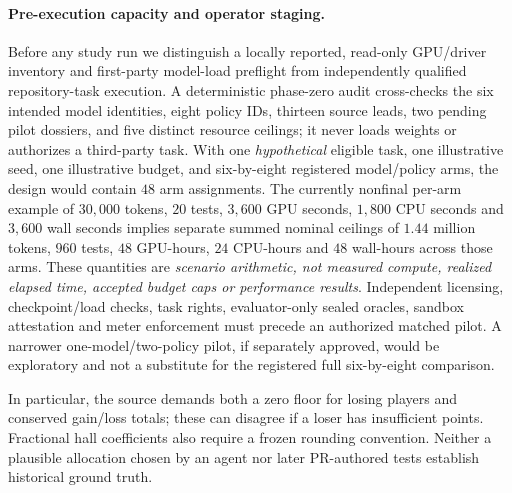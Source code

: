 \documentclass[pdflatex,sn-basic]{sn-jnl}
\begin{document}
\paragraph{Pre-execution capacity and operator staging.}
Before any study run we distinguish a locally reported,
read-only GPU/driver inventory and first-party model-load
preflight from independently qualified repository-task
execution. A deterministic phase-zero audit cross-checks
the six intended model identities, eight policy IDs,
thirteen source leads, two pending pilot dossiers,
and five distinct resource ceilings; it never loads
weights or authorizes a third-party task. With one
\emph{hypothetical} eligible task, one illustrative seed,
one illustrative budget, and six-by-eight registered
model/policy arms, the design would contain $48$ arm
assignments. The currently nonfinal per-arm example
of $30{,}000$ tokens, $20$ tests, $3{,}600$ GPU
seconds, $1{,}800$ CPU seconds and $3{,}600$ wall
seconds implies separate summed nominal ceilings of
$1.44$ million tokens, $960$ tests, $48$ GPU-hours,
$24$ CPU-hours and $48$ wall-hours across those arms.
These quantities are \emph{scenario arithmetic, not
measured compute, realized elapsed time, accepted budget
caps or performance results}. Independent licensing,
checkpoint/load checks, task rights, evaluator-only
sealed oracles, sandbox attestation and meter enforcement
must precede an authorized matched pilot. A narrower
one-model/two-policy pilot, if separately approved,
would be exploratory and not a substitute for the
registered full six-by-eight comparison.

In particular, the source demands both a zero floor
for losing players and conserved gain/loss totals;
these can disagree if a loser has insufficient points.
Fractional hall coefficients also require a frozen
rounding convention. Neither a plausible allocation
chosen by an agent nor later PR-authored tests establish
historical ground truth.
\end{document}
